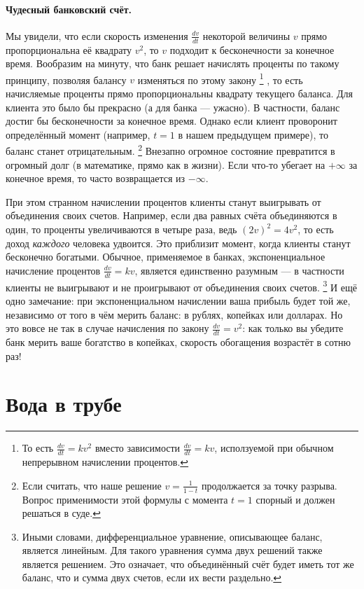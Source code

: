 \paragraph{Чудесный банковский счёт.}
Мы увидели, что если скорость изменения $\tfrac{dv}{dt}$
некоторой величины $v$ прямо пропорциональна её квадрату $v^{2}$,
то $v$ подходит к бесконечности за конечное время.
Вообразим на минуту, что банк решает начислять проценты по такому принципу,
позволяя балансу $v$ изменяться по этому закону%
\footnote{То есть $\tfrac{dv}{dt}=kv^2$ вместо зависимости $\tfrac{dv}{dt}=kv$, исползуемой при обычном непрерывном начислении процентов.}%
, то есть начисляемые проценты прямо пропорциональны квадрату текущего баланса.
Для клиента это было бы прекрасно (а для банка --- ужасно).
В частности, баланс достиг бы бесконечности за конечное время.
Однако если клиент проворонит определённый момент (например, $t=1$ в нашем предыдущем примере), то баланс станет отрицательным.%
\footnote{Если считать, что наше решение
$v=\frac{1}{1 - t}$ продолжается за точку разрыва. Вопрос применимости этой формулы с момента $t=1$ спорный и должен решаться в суде.}
Внезапно огромное состояние превратится в огромный долг (в математике, прямо как в жизни).
Если что-то убегает на $+\infty$ за конечное время, то часто возвращается из $-\infty$.

При этом странном начислении процентов клиенты станут выигрывать от объединения своих счетов.
Например, если два равных счёта объединяются в один,
то проценты увеличиваются в четыре раза, ведь
$(2v)^2=4v^2$,
то есть доход \emph{каждого} человека удвоится.
Это приблизит момент, когда клиенты станут бесконечно богатыми.
Обычное,
применяемое в банках, экспоненциальное начисление процентов
$\frac{dv}{dt}=kv$, является единственно разумным ---
в частности клиенты не выигрывают и не проигрывают
от объединения своих счетов.%
\footnote{Иными словами, дифференциальное уравнение, описывающее баланс, является линейным.
Для такого уравнения сумма двух решений также является решением.
Это означает, что объединённый счёт будет иметь тот же баланс, что и сумма двух счетов, если их вести раздельно.}
И ещё одно замечание: при экспоненциальном начислении ваша прибыль будет той же, независимо от того в чём мерить баланс: в рублях, копейках или долларах.
Но это вовсе не так в случае начисления по закону $\tfrac{dv}{dt}=v^2$:
как только вы убедите банк мерить ваше богатство в копейках, скорость обогащения возрастёт в сотню раз!

\section{Вода в трубе}

